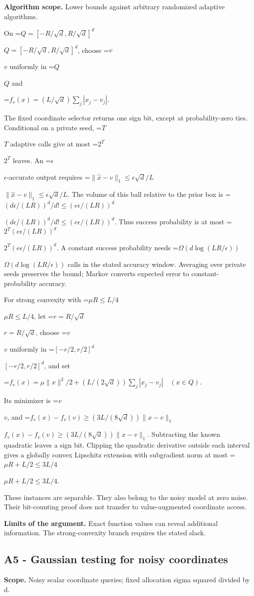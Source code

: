 \documentclass[10pt,a4paper]{article}
\newcommand{\AtlasMath}[1]{\par\begingroup\centering\setbox0=\hbox{$\displaystyle #1$}\ifdim\wd0>1.4\linewidth\typeout{ATLAS WIDE FORMULA: \the\wd0}\fi\ifdim\wd0>\linewidth\resizebox{\linewidth}{!}{\box0}\else\box0\fi\par\endgroup}
\newcommand{\AtlasInlineMath}[1]{\begingroup\setbox0=\hbox{$#1$}\ifdim\wd0>.4\linewidth\endgroup\AtlasMath{#1}\else\endgroup$#1$\fi}
\begin{document}
\textbf{Algorithm scope.} Lower bounds against arbitrary randomized adaptive algorithms.

On \AtlasInlineMath{Q=[-R/\sqrt d,R/\sqrt d]^d}, choose \AtlasInlineMath{v} uniformly in \AtlasInlineMath{Q} and

\AtlasMath{f_v(x)=(L/\sqrt d)\sum_j|x_j-v_j|.}

The fixed coordinate selector returns one sign bit, except at probability-zero ties. Conditional on a private seed, \AtlasInlineMath{T} adaptive calls give at most \AtlasInlineMath{2^T} leaves. An \AtlasInlineMath{\epsilon}-accurate output requires
\AtlasInlineMath{\|\widehat x-v\|_1\le\epsilon\sqrt d/L}.
The volume of this ball relative to the prior box is
\AtlasInlineMath{(d\epsilon/(LR))^d/d!\le(e\epsilon/(LR))^d}.
Thus success probability is at most
\AtlasInlineMath{2^T(e\epsilon/(LR))^d}.
A constant success probability needs \AtlasInlineMath{\Omega(d\log(LR/\epsilon))} calls in the stated accuracy window. Averaging over private seeds preserves the bound; Markov converts expected error to constant-probability accuracy.

For strong convexity with \AtlasInlineMath{\mu R\le L/4}, let \AtlasInlineMath{r=R/\sqrt d}, choose \AtlasInlineMath{v} uniformly in \AtlasInlineMath{[-r/2,r/2]^d}, and set

\AtlasMath{f_v(x)=\mu\|x\|^2/2+(L/(2\sqrt d))\sum_j|x_j-v_j|
\quad(x\in Q).}

Its minimizer is \AtlasInlineMath{v}, and
\AtlasInlineMath{f_v(x)-f_v(v)\ge(3L/(8\sqrt d))\|x-v\|_1}.
Subtracting the known quadratic leaves a sign bit. Clipping the quadratic derivative outside each interval gives a globally convex Lipschitz extension with subgradient norm at most \AtlasInlineMath{\mu R+L/2\le3L/4}.

These instances are separable. They also belong to the noisy model at zero noise. Their bit-counting proof does not transfer to value-augmented coordinate access.

\textbf{Limits of the argument.} Exact function values can reveal additional information. The strong-convexity branch requires the stated slack.

\subsection{A5 - Gaussian testing for noisy coordinates}
\textbf{Scope.} Noisy scalar coordinate queries; fixed allocation sigma squared divided by d.
\end{document}
